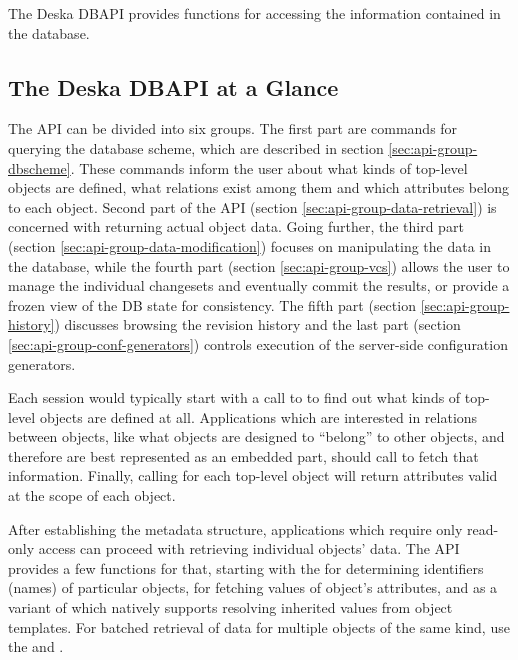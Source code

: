 \documentclass{article}
\begin{document}
The Deska DBAPI provides functions for accessing the information contained in the database.

\subsection{The Deska DBAPI at a Glance}

The API can be divided into six groups.  The first part are commands for querying the database scheme, which are
described in section \ref{sec:api-group-dbscheme}.  These commands inform the user about what kinds of top-level objects are
defined, what relations exist among them and which attributes belong to each object.  Second part of the API
(section \ref{sec:api-group-data-retrieval}) is concerned with returning actual object data.  Going further, the third
part (section \ref{sec:api-group-data-modification}) focuses on manipulating the data in the database, while the fourth
part (section \ref{sec:api-group-vcs}) allows the user to manage the individual changesets and eventually commit the
results, or provide a frozen view of the DB state for consistency.  The fifth part (section \ref{sec:api-group-history})
discusses browsing the revision history and the last part (section \ref{sec:api-group-conf-generators}) controls
execution of the server-side configuration generators.

Each session would typically start with a call to  to find out what kinds of top-level objects
are defined at all.  Applications which are interested in relations between objects, like what objects are designed to
``belong'' to other objects, and therefore are best represented as an embedded part, should call
 to fetch that information.  Finally, calling  for each
top-level object will return attributes valid at the scope of each object.

After establishing the metadata structure, applications which require only read-only access can proceed with retrieving
individual objects' data.  The API provides a few functions for that, starting with the  for
determining identifiers (names) of particular objects,  for fetching values of object's
attributes, and  as a variant of  which natively supports
resolving inherited values from object templates.  For batched retrieval of data for multiple objects of the same kind,
use the  and .
\end{document}
